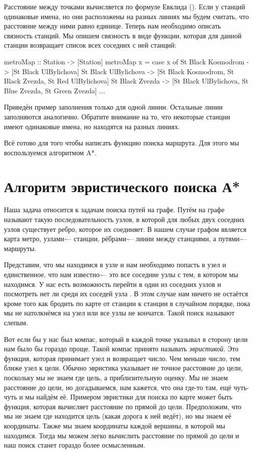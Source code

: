 Расстояние между точками вычисляется по формуле Евклида ().
Если у станций одинаковые имена, но они расположены на разных линиях мы
будем считать, что расстояние между ними равно единице. Теперь нам
необходимо описать связность станций. Мы опишем связность в виде
функции, которая для данной станции возвращает список всех соседних с
ней станций:


\begin{code}
metroMap :: Station -> [Station]
metroMap x = case x of
    St Black Kosmodrom          -> [St Black UlBylichova]
    St Black UlBylichova        -> 
            [St Black Kosmodrom, St Black Zvezda, St Red UlBylichova]  
    St Black  Zvezda            -> 
            [St Black UlBylichova, St Blue  Zvezda, St Green Zvezda]
    ...
\end{code}

Приведён пример заполнения только для одной линии. Остальные линии
заполняются аналогично. Обратите внимание на то, что некоторые станции
имеют одинаковые имена, но находятся на разных линиях.

Всё готово для того чтобы написать функцию поиска маршрута. Для этого мы
воспользуемся алгоритмом A*.

\section{Алгоритм эвристического поиска А*}

Наша задача относится к задачам поиска путей на графе. Путём на графе
называют такую последовательность узлов, в которой для любых двух
соседних узлов существует ребро, которое их соединяет. В нашем случае
графом является карта метро, узлами\textasciitilde{}-- станции,
рёбрами\textasciitilde{}-- линии между станциями, а
путями\textasciitilde{}-- маршруты.

Представим, что мы находимся в узле  и нам необходимо попасть в
узел  и единственное, что нам известно\textasciitilde{}-- это все
соседние узлы с тем, в котором мы находимся. У нас есть возможность
перейти в один из соседних узлов и посмотреть нет ли среди их соседей
узла . В этом случае нам ничего не остаётся кроме того как бродить
по карте от станции к станции в случайном порядке, пока мы не
натолкнёмся на узел  или все узлы не кончатся. Такой поиск
называют слепым.

Вот если бы у нас был компас, который в каждой точке указывал в сторону
цели нам было бы гораздо проще. Такой компас принято называть
\emph{эвристикой}. Это функция, которая принимает узел и возвращает
число. Чем меньше число, тем ближе узел к цели. Обычно эвристика
указывает не точное расстояние до цели, поскольку мы не знаем где цель,
а приблизительную оценку. Мы не знаем расстояние до цели, но
догадываемся, нам кажется, что она где-то там, ещё чуть-чуть и мы найдём
её. Примером эвристики для поиска по карте может быть функция, которая
вычисляет расстояние по прямой до цели. Предположим, что мы не знаем где
находится цель (какая дорога к ней ведёт), но мы знаем её координаты.
Также мы знаем координаты каждой вершины, в которой мы находимся. Тогда
мы можем легко вычислить расстояние по прямой до цели и наш поиск станет
гораздо более осмысленным.

